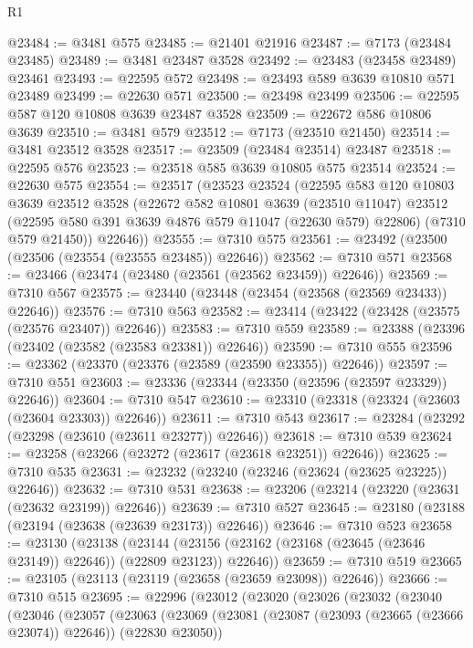 \begin{lexlean}{R1}
\begin{coremodule}
@23484 := @3481 @575
@23485 := @21401 @21916
@23487 := @7173 (@23484 @23485)
@23489 := @3481 @23487 @3528
@23492 := @23483 (@23458 @23489) @23461
@23493 := @22595 @572
@23498 := @23493 @589 @3639 @10810 @571 @23489
@23499 := @22630 @571
@23500 := @23498 @23499
@23506 := @22595 @587 @120 @10808 @3639 @23487 @3528
@23509 := @22672 @586 @10806 @3639
@23510 := @3481 @579
@23512 := @7173 (@23510 @21450)
@23514 := @3481 @23512 @3528
@23517 := @23509 (@23484 @23514) @23487
@23518 := @22595 @576
@23523 := @23518 @585 @3639 @10805 @575 @23514
@23524 := @22630 @575
@23554 := @23517
    (@23523
      @23524
      (@22595
        @583
        @120
        @10803
        @3639
        @23512
        @3528
        (@22672
          @582
          @10801
          @3639
          (@23510 @11047)
          @23512
          (@22595 @580 @391 @3639 @4876 @579 @11047 (@22630 @579) @22806)
          (@7310 @579 @21450))
        @22646))
@23555 := @7310 @575
@23561 := @23492 (@23500 (@23506 (@23554 (@23555 @23485)) @22646))
@23562 := @7310 @571
@23568 := @23466 (@23474 (@23480 (@23561 (@23562 @23459)) @22646))
@23569 := @7310 @567
@23575 := @23440 (@23448 (@23454 (@23568 (@23569 @23433)) @22646))
@23576 := @7310 @563
@23582 := @23414 (@23422 (@23428 (@23575 (@23576 @23407)) @22646))
@23583 := @7310 @559
@23589 := @23388 (@23396 (@23402 (@23582 (@23583 @23381)) @22646))
@23590 := @7310 @555
@23596 := @23362 (@23370 (@23376 (@23589 (@23590 @23355)) @22646))
@23597 := @7310 @551
@23603 := @23336 (@23344 (@23350 (@23596 (@23597 @23329)) @22646))
@23604 := @7310 @547
@23610 := @23310 (@23318 (@23324 (@23603 (@23604 @23303)) @22646))
@23611 := @7310 @543
@23617 := @23284 (@23292 (@23298 (@23610 (@23611 @23277)) @22646))
@23618 := @7310 @539
@23624 := @23258 (@23266 (@23272 (@23617 (@23618 @23251)) @22646))
@23625 := @7310 @535
@23631 := @23232 (@23240 (@23246 (@23624 (@23625 @23225)) @22646))
@23632 := @7310 @531
@23638 := @23206 (@23214 (@23220 (@23631 (@23632 @23199)) @22646))
@23639 := @7310 @527
@23645 := @23180 (@23188 (@23194 (@23638 (@23639 @23173)) @22646))
@23646 := @7310 @523
@23658 := @23130
    (@23138
      (@23144 (@23156 (@23162 (@23168 (@23645 (@23646 @23149)) @22646)) (@22809 @23123)) @22646))
@23659 := @7310 @519
@23665 := @23105 (@23113 (@23119 (@23658 (@23659 @23098)) @22646))
@23666 := @7310 @515
@23695 := @22996
    (@23012
      (@23020
        (@23026
          (@23032
            (@23040
              (@23046
                (@23057
                  (@23063
                    (@23069
                      (@23081 (@23087 (@23093 (@23665 (@23666 @23074)) @22646)) (@22830 @23050))

\end{coremodule}
\end{lexlean}
